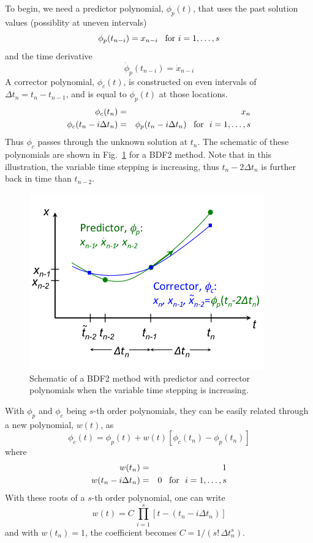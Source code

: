 To begin, we need a predictor polynomial, $\phi_{p}(t)$, that uses
the past solution values (possiblity at uneven intervals)
\[
\phi_{p}(t_{n-i})=x_{n-i}\mbox{{\,\,\,\ for\,\,}}i=1,\ldots,s
\]
and the time derivative
\[
\dot{\phi}_{p}(t_{n-i})=\dot{x}_{n-i}
\]
A corrector polynomial, $\phi_{c}(t)$, is constructed on even intervals
of $\Delta t_{n}=t_{n}-t_{n-1}$, and is equal to $\phi_{p}(t)$ at
those locations. 
\begin{eqnarray*}
\phi_{c}(t_{n}) & = & x_{n}\\
\phi_{c}(t_{n}-i\Delta t_{n}) & = & \phi_{p}(t_{n}-i\Delta t_{n})\mbox{{\,\,\,\ for\,\,} }i=1,\ldots,s
\end{eqnarray*}
Thus $\phi_{c}$ passes through the unknown solution at $t_{n}$.
The schematic of these polynomials are shown in Fig.~\ref{rythmos:fig:BDF2-schematic}
for a BDF2 method. Note that in this illustration, the variable time
stepping is increasing, thus $t_{n}-2\Delta t_{n}$ is further back
in time than $t_{n-2}$.

\begin{figure}
\centering{}\includegraphics[width=4in]{figures/BDF2}\caption{Schematic of a BDF2 method with predictor and corrector polynomials
when the variable time stepping is increasing.\label{rythmos:fig:BDF2-schematic}}
\end{figure}


With $\phi_{p}$ and $\phi_{c}$ being $s$-th order polynomials,
they can be easily related through a new polynomial, $w(t)$, as
\begin{equation}
\phi_{c}(t)=\phi_{p}(t)+w(t)[\phi_{c}(t_{n})-\phi_{p}(t_{n})]\label{rythmos:eq:BDF-corrector}
\end{equation}
where
\begin{eqnarray*}
w(t_{n}) & = & 1\\
w(t_{n}-i\Delta t_{n}) & = & 0\mbox{{\,\,\,\ for\,\,} }i=1,\ldots,s
\end{eqnarray*}
With these roots of a $s$-th order polynomial, one can write
\[
w(t)=C\,\prod_{i=1}^{s}[t-(t_{n}-i\Delta t_{n})]
\]
and with $w(t_{n})=1$, the coefficient becomes $C=1/(s!\,\Delta t_{n}^{s})$.

